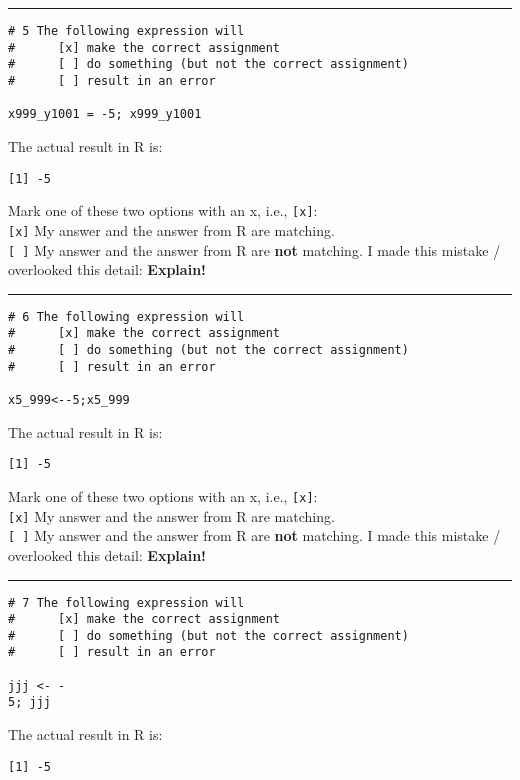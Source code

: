 \documentclass[12pt,letterpaper,final]{article}\usepackage[]{graphicx}\usepackage[]{xcolor}
\begin{document}
\begin{enumerate}
\hrule


\begin{verbatim}
# 5 The following expression will
#      [x] make the correct assignment
#      [ ] do something (but not the correct assignment)
#      [ ] result in an error

x999_y1001 = -5; x999_y1001
\end{verbatim}

The actual result in R is: 
\begin{verbatim}
[1] -5
\end{verbatim}


Mark one of these two options with an x, i.e., \verb|[x]|: \\
\verb|[x]| My answer and the answer from R are matching. \\
\verb|[ ]| My answer and the answer from R are {\bf not} matching. 
I made this mistake / overlooked this detail: {\bf Explain!} \\


\hrule


\begin{verbatim}
# 6 The following expression will
#      [x] make the correct assignment
#      [ ] do something (but not the correct assignment)
#      [ ] result in an error

x5_999<--5;x5_999
\end{verbatim}

The actual result in R is: 
\begin{verbatim}
[1] -5
\end{verbatim}


Mark one of these two options with an x, i.e., \verb|[x]|: \\
\verb|[x]| My answer and the answer from R are matching. \\
\verb|[ ]| My answer and the answer from R are {\bf not} matching. 
I made this mistake / overlooked this detail: {\bf Explain!} \\


\hrule


\begin{verbatim}
# 7 The following expression will
#      [x] make the correct assignment
#      [ ] do something (but not the correct assignment)
#      [ ] result in an error

jjj <- -
5; jjj
\end{verbatim}

The actual result in R is: 
\begin{verbatim}
[1] -5
\end{verbatim}



\end{enumerate}
\end{document}
